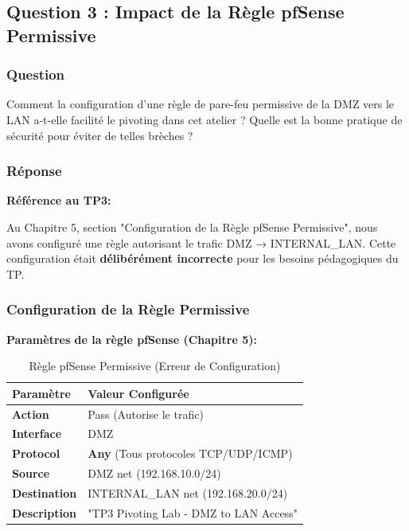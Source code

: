 \documentclass[12pt,a4paper,openany]{report}
\begin{document}
	
	\subsection{Question 3 : Impact de la Règle pfSense Permissive}
	
	\subsubsection{Question}
	
	Comment la configuration d'une règle de pare-feu permissive de la DMZ 
	vers le LAN a-t-elle facilité le pivoting dans cet atelier ? Quelle est 
	la bonne pratique de sécurité pour éviter de telles brèches ?
	
	\subsubsection{Réponse}
	
	\textbf{Référence au TP3:}
	
	Au Chapitre 5, section "Configuration de la Règle pfSense Permissive", 
	nous avons configuré une règle autorisant le trafic DMZ → INTERNAL\_LAN. 
	Cette configuration était \textbf{délibérément incorrecte} pour les 
	besoins pédagogiques du TP.
	
	\subsubsection{Configuration de la Règle Permissive}
	
	\textbf{Paramètres de la règle pfSense (Chapitre 5):}
	
	\begin{table}[H]
		\centering
		\renewcommand{\arraystretch}{1.3}
		\begin{tabular}{>{\bfseries}p{4cm} p{8cm}}
			\hline
			\textbf{Paramètre} & \textbf{Valeur Configurée} \\
			\hline
			Action & Pass (Autorise le trafic) \\
			Interface & DMZ \\
			Protocol & \textbf{Any} (Tous protocoles TCP/UDP/ICMP) \\
			Source & DMZ net (192.168.10.0/24) \\
			Destination & INTERNAL\_LAN net (192.168.20.0/24) \\
			Description & "TP3 Pivoting Lab - DMZ to LAN Access" \\
			\hline
		\end{tabular}
		\caption{Règle pfSense Permissive (Erreur de Configuration)}
	\end{table}
	
\end{document}
